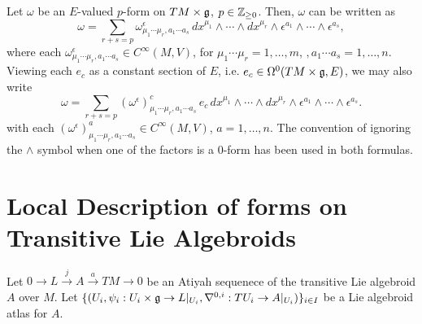 \begin{theorem}\label{TheoremDecompOfVectorValuedFormsTLAEpsilonsDxs}
Let $\omega$ be an $E$-valued $p$-form on $TM \times \mathfrak{g}$, $p \in \mathbb{Z}_{\geq 0}$. Then, $\omega$ can be written as
\begin{equation}
    \omega = \sum_{r + s = p} \omega^\epsilon_{\mu_1 \cdots \mu_r, a_1 \cdots a_s}\, dx^{\mu_1} \wedge \cdots \wedge dx^{\mu_r} \wedge \epsilon^{a_1} \wedge \cdots \wedge \epsilon^{a_s},
\end{equation}
where each $\omega^\epsilon_{\mu_1 \cdots \mu_r, a_1 \cdots a_s} \in C^\infty(M, V)$, for $\mu_1 \cdots \mu_r = 1, \dots, m$, $, a_1 \cdots a_s = 1, \dots, n$. Viewing each $e_c$ as a constant section of $E$, i.e. $e_c \in \Omega^0(TM \times \mathfrak{g}, E)$, we may also write
\begin{equation}
    \omega = \sum_{r + s = p} \left(\omega^\epsilon\right)^c_{\mu_1 \cdots \mu_r, a_1 \cdots a_s}\, e_c \, dx^{\mu_1} \wedge \cdots \wedge dx^{\mu_r} \wedge \epsilon^{a_1} \wedge \cdots \wedge \epsilon^{a_s}.
\end{equation} 
with each $\left(\omega^\epsilon\right)^a_{\mu_1 \cdots \mu_r, a_1 \cdots a_s} \in C^\infty(M, V)$, $a = 1, \dots, n$.
The convention of ignoring the $\wedge$ symbol when one of the factors is a $0$-form has been used in both formulas.
\end{theorem}

\section{Local Description of forms on Transitive Lie Algebroids}

Let $0 \to L \xrightarrow{j} A \xrightarrow{a} TM \to 0$ be an Atiyah sequenece of the transitive Lie algebroid $A$ over $M$. Let $\{(U_i, \psi_i: U_i \times \mathfrak{g} \to L|_{U_i}, \nabla^{0, i}: TU_i \to A|_{U_i})\}_{i \in I}$ be a Lie algebroid atlas for $A$.

